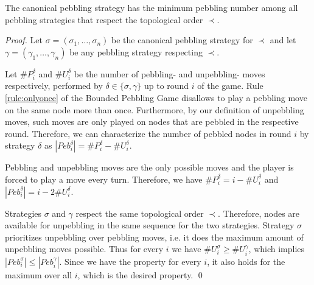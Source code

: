 \begin{theorem}
\label{theorem:canonical}
The canonical pebbling strategy has the minimum pebbling number among all pebbling strategies that respect the topological order $\prec$.
\end{theorem}
\begin{proof}
Let $\sigma = (\sigma_1,\ldots,\sigma_n)$ be the canonical pebbling strategy for $\prec$ and let $\gamma = (\gamma_1,\ldots,\gamma_n)$ be any pebbling strategy respecting $\prec$.

Let $\#P^{\delta}_i$ and $\#U^{\delta}_i$ be the number of pebbling- and unpebbling- moves respectively, performed by $\delta \in \{\sigma,\gamma\}$ up to round $i$ of the game.
Rule \ref{rule:onlyonce} of the Bounded Pebbling Game disallows to play a pebbling move on the same node more than once.
Furthermore, by our definition of unpebbling moves, such moves are only played on nodes that are pebbled in the respective round.
Therefore, we can characterize the number of pebbled nodes in round $i$ by strategy $\delta$ as $|Peb^{\delta}_i| = \#P^{\delta}_i - \#U^{\delta}_i$.

Pebbling and unpebbling moves are the only possible moves and the player is forced to play a move every turn.
Therefore, we have $\#P^{\delta}_i = i - \#U^{\delta}_i$ and $|Peb^{\delta}_i| = i - 2 \#U^{\delta}_i$.

Strategies $\sigma$ and $\gamma$ respect the same topological order $\prec$.
Therefore, nodes are available for unpebbling in the same sequence for the two strategies.
Strategy $\sigma$ prioritizes unpebbling over pebbling moves, i.e. it does the maximum amount of unpebbling moves possible.
Thus for every $i$ we have $\#U^{\sigma}_i \geq \#U^{\gamma}_i$, which implies $|Peb^{\sigma}_i| \leq |Peb^{\gamma}_i|$.
Since we have the property for every $i$, it also holds for the maximum over all $i$, which is the desired property.  \hspace*{\fill} \qed


\end{proof}

